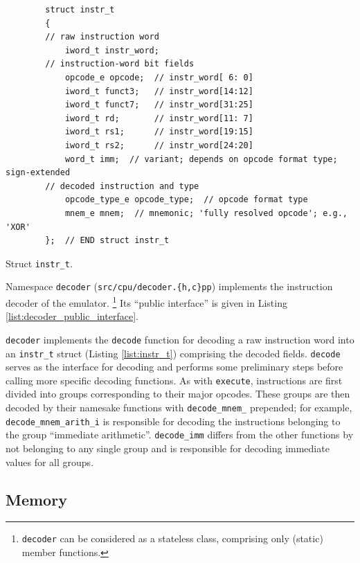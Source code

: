 \documentclass[a4paper]{amsart}
\begin{document}
\begin{listing}
    \begin{verbatim}
        struct instr_t
        {
        // raw instruction word
            iword_t instr_word;
        // instruction-word bit fields
            opcode_e opcode;  // instr_word[ 6: 0]
            iword_t funct3;   // instr_word[14:12]
            iword_t funct7;   // instr_word[31:25]
            iword_t rd;       // instr_word[11: 7]
            iword_t rs1;      // instr_word[19:15]
            iword_t rs2;      // instr_word[24:20]
            word_t imm;  // variant; depends on opcode format type; sign-extended
        // decoded instruction and type
            opcode_type_e opcode_type;  // opcode format type
            mnem_e mnem;  // mnemonic; 'fully resolved opcode'; e.g., 'XOR'
        };  // END struct instr_t
    \end{verbatim}
    \caption{Struct \texttt{instr\_t}.}
    \label{list:instr_t}
\end{listing}

\noindent
Namespace \texttt{decoder} (\texttt{src/cpu/decoder.\{h,c\}pp}) implements the instruction decoder of the emulator.%
\footnote{\texttt{decoder} can be considered as a stateless class, comprising only (static) member functions.}
Its ``public interface'' is given in Listing \ref{list:decoder_public_interface}.

\texttt{decoder} implements the \texttt{decode} function for decoding a raw instruction word into an \texttt{instr\_t} struct (Listing \ref{list:instr_t}) comprising the decoded fields.
\texttt{decode} serves as the interface for decoding and performs some preliminary steps before calling more specific decoding functions.
As with \texttt{execute}, instructions are first divided into groups corresponding to their major opcodes.
These groups are then decoded by their namesake functions with \texttt{decode\_mnem\_} prepended; for example, \texttt{decode\_mnem\_arith\_i} is responsible for decoding the instructions belonging to the group ``immediate arithmetic''.
\texttt{decode\_imm} differs from the other functions by not belonging to any single group and is responsible for decoding immediate values for all groups.


\medbreak
\subsection{Memory}
\end{document}
